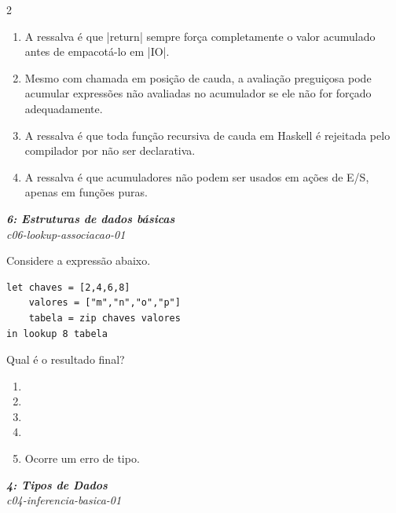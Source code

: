 \documentclass[a4paper,10pt,brazil]{article}
\begin{document}
\begin{multicols}{2}
\begin{enumerate}
  \item A ressalva é que \haskellinline|return| sempre força completamente o valor acumulado antes de empacotá-lo em \haskellinline|IO|.

  \item Mesmo com chamada em posição de cauda, a avaliação preguiçosa pode acumular expressões não avaliadas no acumulador se ele não for forçado adequadamente.

  \item A ressalva é que toda função recursiva de cauda em Haskell é rejeitada pelo compilador por não ser declarativa.

  \item A ressalva é que acumuladores não podem ser usados em ações de E/S, apenas em funções puras.


\end{enumerate}

\begin{flushright}
  \footnotesize
  \textit{\textbf{6: Estruturas de dados básicas}}\\
  \textit{c06-lookup-associacao-01}\\

\end{flushright}
Considere a expressão abaixo.
\begin{verbatim}
let chaves = [2,4,6,8]
    valores = ["m","n","o","p"]
    tabela = zip chaves valores
in lookup 8 tabela
\end{verbatim}
Qual é o resultado final?

\begin{enumerate}
  \item {}

  \item {}

  \item {}

  \item {}

  \item Ocorre um erro de tipo.


\end{enumerate}

\begin{flushright}
  \footnotesize
  \textit{\textbf{4: Tipos de Dados}}\\
  \textit{c04-inferencia-basica-01}\\


\end{flushright}
\end{multicols}
\end{document}
